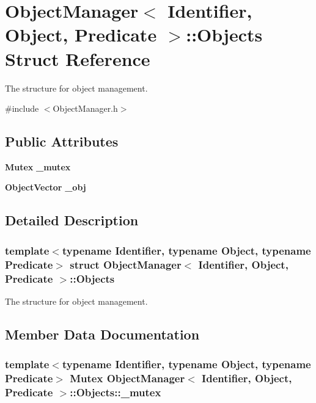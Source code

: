 \section{ObjectManager$<$ Identifier, Object, Predicate $>$::Objects Struct Reference}
\label{structObjectManager_1_1Objects}


The structure for object management.  




{\ttfamily \#include $<$ObjectManager.h$>$}

\subsection*{Public Attributes}
\begin{DoxyCompactItemize}
\item 
{\bf Mutex} {\bf \_\-mutex}
\item 
{\bf ObjectVector} {\bf \_\-obj}
\end{DoxyCompactItemize}


\subsection{Detailed Description}
\subsubsection*{template$<$typename Identifier, typename Object, typename Predicate$>$ struct ObjectManager$<$ Identifier, Object, Predicate $>$::Objects}

The structure for object management. 

\subsection{Member Data Documentation}
\subsubsection[{\_\-mutex}]{\setlength{\rightskip}{0pt plus 5cm}template$<$typename Identifier, typename Object, typename Predicate$>$ {\bf Mutex} {\bf ObjectManager}$<$ Identifier, Object, Predicate $>$::{\bf Objects::\_\-mutex}\hspace{0.3cm}{\ttfamily  [mutable]}}\label{structObjectManager_1_1Objects_a4ba7fb259cc6ebca1a253b366a079f64}



